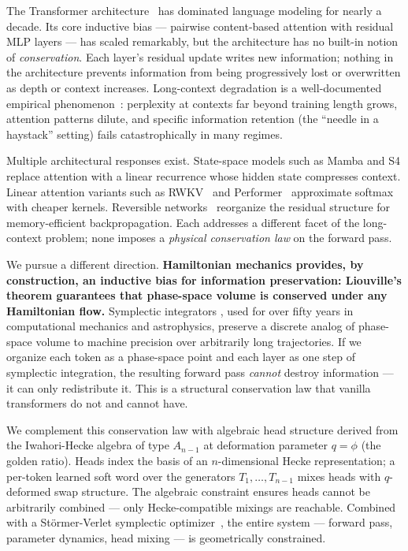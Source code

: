\documentclass[11pt]{article}
\newcommand{\phigold}{\phi}
\begin{document}
The Transformer architecture~\citep{vaswani2017attention} has dominated
language modeling for nearly a decade. Its core inductive bias --- pairwise
content-based attention with residual MLP layers --- has scaled remarkably,
but the architecture has no built-in notion of \emph{conservation}. Each
layer's residual update writes new information; nothing in the architecture
prevents information from being progressively lost or overwritten as depth
or context increases. Long-context degradation is a well-documented
empirical phenomenon~\citep{liu2024lost, an2024lveval}: perplexity at
contexts far beyond training length grows, attention patterns dilute, and
specific information retention (the ``needle in a haystack'' setting)
fails catastrophically in many regimes.

Multiple architectural responses exist. State-space models such as Mamba
\citep{gu2023mamba} and S4 \citep{gu2021efficiently} replace attention
with a linear recurrence whose hidden state compresses context. Linear
attention variants such as RWKV~\citep{peng2023rwkv} and
Performer~\citep{choromanski2020rethinking} approximate softmax with
cheaper kernels. Reversible networks~\citep{gomez2017reversible} reorganize
the residual structure for memory-efficient backpropagation. Each addresses
a different facet of the long-context problem; none imposes a \emph{physical
conservation law} on the forward pass.

We pursue a different direction. \textbf{Hamiltonian mechanics
provides, by construction, an inductive bias for information preservation:
Liouville's theorem guarantees that phase-space volume is conserved
under any Hamiltonian flow.} Symplectic integrators
\citep{leimkuhler2004simulating, marsden2001discrete}, used for over fifty
years in computational mechanics and astrophysics, preserve a discrete
analog of phase-space volume to machine precision over arbitrarily long
trajectories. If we organize each token as a phase-space point and each
layer as one step of symplectic integration, the resulting forward pass
\emph{cannot} destroy information --- it can only redistribute it. This
is a structural conservation law that vanilla transformers do not and
cannot have.

We complement this conservation law with algebraic head structure derived
from the Iwahori-Hecke algebra of type $A_{n-1}$ at deformation parameter
$q = \phigold$ (the golden ratio). Heads index the basis of an
$n$-dimensional Hecke representation; a per-token learned soft word over
the generators $T_1, \ldots, T_{n-1}$ mixes heads with $q$-deformed swap
structure. The algebraic constraint ensures heads cannot be arbitrarily
combined --- only Hecke-compatible mixings are reachable. Combined with
a Störmer-Verlet symplectic optimizer~\citep{leimkuhler2004simulating},
the entire system --- forward pass, parameter dynamics, head mixing --- is
geometrically constrained.
\end{document}
